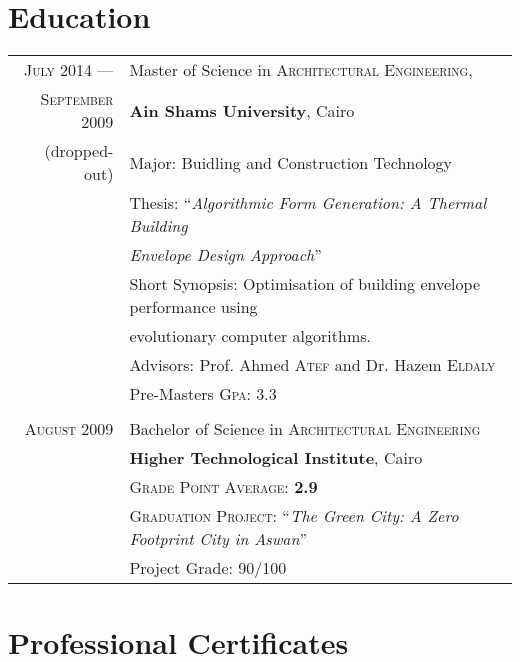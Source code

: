 \documentclass[a4paper,11pt]{article} %
\begin{document}

\section{Education}

\begin{tabular}{r|l}	
\textsc{July} 2014 --- & Master of Science in \textsc{Architectural Engineering},\\ 
\textsc{September} 2009 &\textbf{Ain Shams University}, Cairo\\
\small(dropped-out)& Major: Buidling and Construction Technology\\
& Thesis: ``\emph{Algorithmic Form Generation: A Thermal Building}\\
&\emph{Envelope Design Approach}'' \\
&\small Short Synopsis: Optimisation of building envelope performance using\\
&\small evolutionary computer algorithms.\\
& \small Advisors: Prof. Ahmed \textsc{Atef} and Dr. Hazem \textsc{Eldaly}\\
&\normalsize Pre-Masters \textsc{Gpa}: 3.3\\
\multicolumn{2}{c}{} \\


\textsc{August} 2009& Bachelor of Science in \textsc{Architectural Engineering} \\
& \normalsize\textbf{Higher Technological Institute}, Cairo\\
&\small \textsc{Grade Point Average}: \textbf{2.9} \\
&\small \textsc{Graduation Project:} ``\emph{The Green City: A Zero Footprint City in Aswan}''\\
&\small Project Grade: 90/100\\

\end{tabular}

\section{Professional Certificates}
\end{document}
